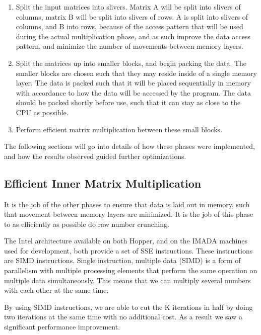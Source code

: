 \documentclass[a4paper,11pt,oneside]{book}
\begin{document}
\begin{enumerate}
  \item Split the input matrices into slivers. Matrix A will be split into 
  slivers of columns, matrix B will be split into slivers of rows. A is split
  into slivers of columns, and B into rows, because of the access pattern that
  will be used during the actual multiplication phase, and as such improve the
  data access pattern, and minimize the number of movements between memory
  layers.
  \item Split the matrices up into smaller blocks, and begin packing the data.
  The smaller blocks are chosen such that they may reside inside of a single
  memory layer. The data is packed such that it will be placed sequentially in
  memory with accordance to how the data will be accessed by the program. 
  The data should be packed shortly before use, such that it can stay as close 
  to the CPU as possible.
  \item Perform efficient matrix multiplication between these small blocks.
\end{enumerate}


The following sections will go into details of how these phases were
implemented, and how the results observed guided further optimizations.

\subsection{Efficient Inner Matrix Multiplication}

It is the job of the other phases to ensure that data is laid out in memory,
such that movement between memory layers are minimized. It is the job of this
phase to as efficiently as possible do raw number crunching.

The Intel architecture available on both Hopper, and on the IMADA machines used
for development, both provide a set of SSE instructions. These instructions are
SIMD instructions. Single instruction, multiple data (SIMD) is a form of
parallelism with multiple processing elements that perform the same operation on
multiple data simultaneously. This means that we can multiply several numbers
with each other at the same time. 

By using SIMD instructions, we are able to cut the K iterations in half by doing
two iterations at the same time with no additional cost. As a result we saw a
significant performance improvement. %
\end{document}
